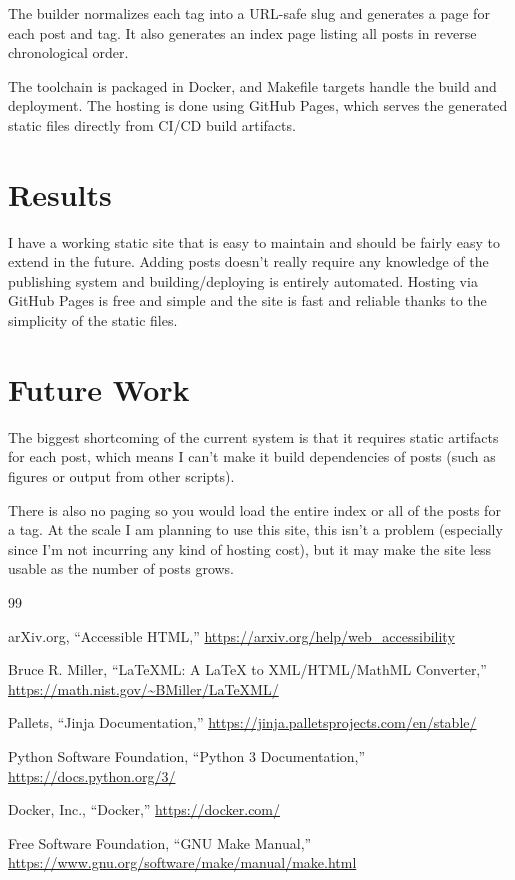 \documentclass{article}
\begin{document}
The builder normalizes each tag into a URL-safe slug and generates a page for each
post and tag. It also generates an index page listing all posts in reverse chronological
order.

The toolchain is packaged in Docker\cite{docker}, and
Makefile\cite{gnu_make} targets handle the build and deployment.
The hosting is done using GitHub Pages, which serves the generated static files directly
from CI/CD build artifacts.

\section{Results}

I have a working static site that is easy to maintain and should be fairly easy to
extend in the future. Adding posts doesn't really require any knowledge of the
publishing system and building/deploying is entirely automated. Hosting via GitHub
Pages is free and simple and the site is fast and reliable thanks to the simplicity
of the static files.

\section{Future Work}

The biggest shortcoming of the current system is that it requires static artifacts for
each post, which means I can't make it build dependencies of posts (such as figures or
output from other scripts).

There is also no paging so you would load the entire index or all of the posts for a tag.
At the scale I am planning to use this site, this isn't a problem (especially since I'm
not incurring any kind of hosting cost), but it may make the site less usable as the
number of posts grows.

\begin{thebibliography}{99}

arXiv.org, ``Accessible HTML,''
\url{https://arxiv.org/help/web_accessibility}

Bruce R. Miller, ``LaTeXML: A LaTeX to XML/HTML/MathML Converter,''
\url{https://math.nist.gov/~BMiller/LaTeXML/}

Pallets, ``Jinja Documentation,''
\url{https://jinja.palletsprojects.com/en/stable/}

Python Software Foundation, ``Python 3 Documentation,''
\url{https://docs.python.org/3/}

Docker, Inc., ``Docker,''
\url{https://docker.com/}

Free Software Foundation, ``GNU Make Manual,''
\url{https://www.gnu.org/software/make/manual/make.html}

\end{thebibliography}
\end{document}
